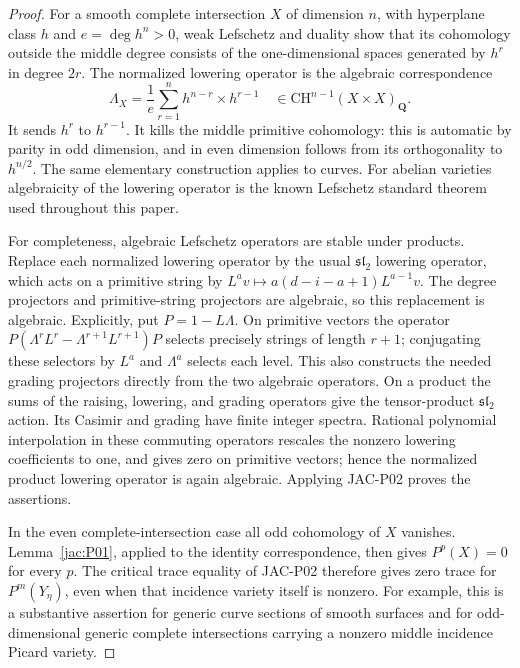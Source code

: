 \documentclass[11pt,a4paper]{article}
\begin{document}
\begin{proof}
For a smooth complete intersection $X$ of dimension $n$, with
hyperplane class $h$ and $e=\deg h^n>0$, weak Lefschetz and duality
show that its cohomology outside the middle degree consists of the
one-dimensional spaces generated by $h^r$ in degree $2r$.
The normalized lowering operator is the algebraic correspondence
\[
 \Lambda_X=\frac1e\sum_{r=1}^{n}
           h^{n-r}\times h^{r-1}
 \quad\in\mathrm{CH}^{n-1}(X\times X)_{\mathbf Q}.
\]
It sends $h^r$ to $h^{r-1}$.  It kills the middle primitive
cohomology: this is automatic by parity in odd dimension, and in
even dimension follows from its orthogonality to $h^{n/2}$.
The same elementary construction applies to curves.  For abelian
varieties algebraicity of the lowering operator is the known
Lefschetz standard theorem used throughout this paper.

For completeness, algebraic Lefschetz operators are stable under
products.  Replace each normalized lowering operator by the usual
$\mathfrak{sl}_2$ lowering operator, which acts on a primitive string
by $L^av\mapsto a(d-i-a+1)L^{a-1}v$.  The degree projectors and
primitive-string projectors are algebraic, so this replacement is
algebraic.  Explicitly, put $P=1-L\Lambda$. On primitive vectors the
operator
$P(\Lambda^rL^r-\Lambda^{r+1}L^{r+1})P$ selects precisely strings
of length $r+1$; conjugating these selectors by $L^a$ and
$\Lambda^a$ selects each level. This also constructs the needed
grading projectors directly from the two algebraic operators.
On a product the sums of the raising, lowering, and
grading operators give the tensor-product $\mathfrak{sl}_2$ action.
Its Casimir and grading have finite integer spectra.  Rational
polynomial interpolation in these commuting operators rescales the
nonzero lowering coefficients to one, and gives zero on primitive
vectors; hence the normalized product lowering operator is again
algebraic.  Applying JAC-P02 proves the assertions.

In the even complete-intersection case all odd cohomology of $X$
vanishes.  Lemma~\ref{jac:P01}, applied to the identity correspondence,
then gives $P^p(X)=0$ for every $p$.  The critical trace equality
of JAC-P02 therefore gives zero trace for $P^m(Y_\eta)$, even when
that incidence variety itself is nonzero.  For example, this is a
substantive assertion for generic curve sections of smooth surfaces
and for odd-dimensional generic complete intersections carrying a
nonzero middle incidence Picard variety.
\end{proof}
\end{document}
